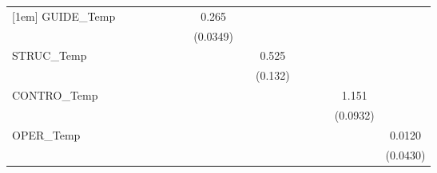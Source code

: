 \begin{table}[htbp]
\begin{tabular}{l*{14}{c}}
[1em]
GUIDE\_Temp  &                     &                     &                     &                     &                     &                     &       0.265\sym{***}&                     &                     &                     &                     &                     &                     &                     \\
            &                     &                     &                     &                     &                     &                     &    (0.0349)         &                     &                     &                     &                     &                     &                     &                     \\
[1em]
STRUC\_Temp  &                     &                     &                     &                     &                     &                     &                     &                     &       0.525\sym{***}&                     &                     &                     &                     &                     \\
            &                     &                     &                     &                     &                     &                     &                     &                     &     (0.132)         &                     &                     &                     &                     &                     \\
[1em]
CONTRO\_Temp &                     &                     &                     &                     &                     &                     &                     &                     &                     &                     &                     &                     &       1.151\sym{***}&                     \\
            &                     &                     &                     &                     &                     &                     &                     &                     &                     &                     &                     &                     &    (0.0932)         &                     \\
[1em]
OPER\_Temp   &                     &                     &                     &                     &                     &                     &                     &                     &                     &                     &                     &                     &                     &      0.0120         \\
            &                     &                     &                     &                     &                     &                     &                     &                     &                     &                     &                     &                     &                     &    (0.0430)         \\

\end{tabular}
\end{table}
